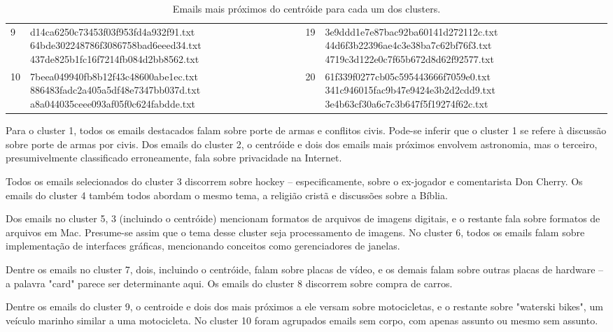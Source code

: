 \documentclass[10pt,twocolumn,letterpaper]{article}
\begin{document}
\begin{table}
\begin{center}
\begin{tabular}{ | l | l || l | l | p{8cm} |}
9 & \parbox[c][1.5cm]{6cm}{d14ca6250c73453f03f953fd4a932f91.txt 64bde302248786f3086758bad6eeed34.txt 437de825b1fc16f7214fb084d2bb8562.txt} & 19 & \parbox[c][1.5cm]{6cm}{3e9ddd1e7e87bac92ba60141d272112c.txt 44d6f3b22396ae4c3e38ba7c62bf76f3.txt 4719c3d122e0c7f65b672d8d62f92577.txt} \\
10 & \parbox[c][1.5cm]{6cm}{7beea049940fb8b12f43c48600abe1ec.txt 886483fadc2a405a5df48e7347bb037d.txt a8a044035ceee093af05f0c624fabdde.txt} & 20 & \parbox[c][1.5cm]{6cm}{61f339f0277cb05c595443666f7059e0.txt 341c946015fac9b47e9424e3b2d2cdd9.txt 3e4b63cf30a6c7c3b647f5f19274f62c.txt}  \\
\hline
\end{tabular}
\end{center}
\caption{Emails mais próximos do centróide para cada um dos clusters.}
\label{tbl-closest}
\end{table}

Para o cluster 1, todos os emails destacados falam sobre porte de armas e conflitos civis. Pode-se inferir que o cluster 1 se refere à discussão sobre porte de armas por civis. Dos emails do cluster 2, o centróide e dois dos emails mais próximos envolvem astronomia, mas o terceiro, presumivelmente classificado erroneamente, fala sobre privacidade na Internet.

Todos os emails selecionados do cluster 3 discorrem sobre hockey -- especificamente, sobre o ex-jogador e comentarista Don Cherry. Os emails do cluster 4 também todos abordam o mesmo tema, a religião cristã e discussões sobre a Bíblia.

Dos emails no cluster 5, 3 (incluindo o centróide) mencionam formatos de arquivos de imagens digitais, e o restante fala sobre formatos de arquivos em Mac. Presume-se assim que o tema desse cluster seja processamento de imagens. No cluster 6, todos os emails falam sobre implementação de interfaces gráficas, mencionando conceitos como gerenciadores de janelas.

Dentre os emails no cluster 7, dois, incluindo o centróide, falam sobre placas de vídeo, e os demais falam sobre outras placas de hardware -- a palavra "card" parece ser determinante aqui. Os emails do cluster 8 discorrem sobre compra de carros.

Dentre os emails do cluster 9, o centroide e dois dos mais próximos a ele versam sobre motocicletas, e o restante sobre "waterski bikes", um veículo marinho similar a uma motocicleta. No cluster 10 foram agrupados emails sem corpo, com apenas assunto ou mesmo sem assunto.
\end{document}
